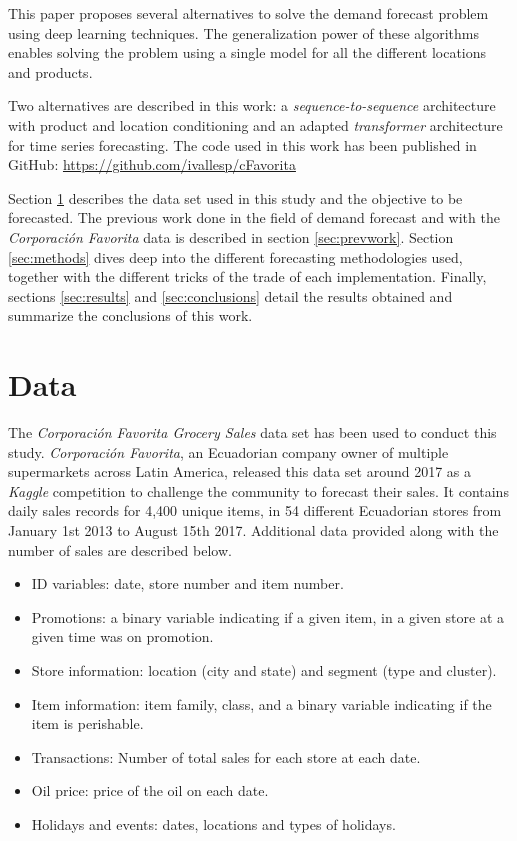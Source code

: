\documentclass{elsarticle}
\begin{document}
	This paper proposes several alternatives to solve the demand forecast problem using deep learning techniques. The generalization power of these algorithms enables solving the problem using a single model for all the different locations and products. 
	
	Two alternatives are described in this work: a \textit{sequence-to-sequence} architecture with product and location conditioning and an adapted \textit{transformer} architecture for time series forecasting. The code used in this work has been published in GitHub: \url{https://github.com/ivallesp/cFavorita}
	
	 Section \ref{sec:data} describes the data set used in this study and the objective to be forecasted. The previous work done in the field of demand forecast and with the \textit{Corporación Favorita} data is described in section \ref{sec:prevwork}. Section \ref{sec:methods} dives deep into the different forecasting methodologies used, together with the different tricks of the trade of each implementation. 
	Finally, sections \ref{sec:results} and \ref{sec:conclusions} detail the results obtained and summarize the conclusions of this work.
	
	
	\section{Data} \label{sec:data}
	The \textit{Corporación Favorita Grocery Sales} data set \cite{corporacionfavoritadataset2018} has been used to conduct this study. \textit{Corporación Favorita}, an Ecuadorian company owner of multiple supermarkets across Latin America, released this data set around 2017 as a \textit{Kaggle} competition to challenge the community to forecast their sales. It contains daily sales records for 4,400 unique items, in 54 different Ecuadorian stores from January 1st 2013 to August 15th 2017. Additional data provided along with the number of sales are described below.
	
	\begin{itemize}
		\item ID variables: date, store number and item number.
		\item Promotions: a binary variable indicating if a given item, in a given store at a given time was on promotion.
		\item Store information: location (city and state) and segment (type and cluster).
		\item Item information: item family, class, and a binary variable indicating if the item is perishable.
		\item Transactions: Number of total sales for each store at each date.
		\item Oil price: price of the oil on each date.
		\item Holidays and events: dates, locations and types of holidays.
	\end{itemize}
	
\end{document}
